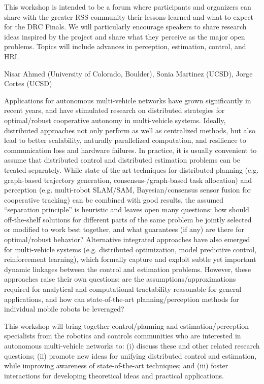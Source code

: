 \begin{spacing}{1.0}
{This workshop is intended to be a forum where participants and organizers can share with the greater RSS community their lessons learned and what to expect for the DRC Finals. We will particularly encourage speakers to share research ideas inspired by the project and share what they perceive as the major open problems. Topics will include advances in perception, estimation, control, and HRI.
}


{Nisar Ahmed (University of Colorado, Boulder), Sonia Martinez (UCSD), Jorge Cortes (UCSD)}
{
Applications for autonomous multi-vehicle networks have grown significantly in recent years, and have stimulated research on distributed strategies for optimal/robust cooperative autonomy in multi-vehicle systems. Ideally, distributed approaches not only perform as well as centralized methods, but also lead to better scalability, naturally parallelized computation, and resilience to communication loss and hardware failures. In practice, it is usually convenient to assume that distributed control and distributed estimation problems can be treated separately. While state-of-the-art techniques for distributed planning (e.g. graph-based trajectory generation, consensus-/graph-based task allocation) and perception (e.g. multi-robot SLAM/SAM, Bayesian/consensus sensor fusion for cooperative tracking) can be combined with good results, the assumed “separation principle” is heuristic and leaves open many questions: how should off-the-shelf solutions for different parts of the same problem be jointly selected or modified to work best together, and what guarantees (if any) are there for optimal/robust behavior? Alternative integrated approaches have also emerged for multi-vehicle systems (e.g. distributed optimization, model predictive control, reinforcement learning), which formally capture and exploit subtle yet important dynamic linkages between the control and estimation problems. However, these approaches raise their own questions: are the assumptions/approximations required for analytical and computational tractability reasonable for general applications, and how can state-of-the-art planning/perception methods for individual mobile robots be leveraged?

This workshop will bring together control/planning and estimation/perception specialists from the robotics and controls communities who are interested in autonomous multi-vehicle networks to: (i) discuss these and other related research questions; (ii) promote new ideas for unifying distributed control and estimation, while improving awareness of state-of-the-art techniques; and (iii) foster interactions for developing theoretical ideas and practical applications.
}


\end{spacing}

